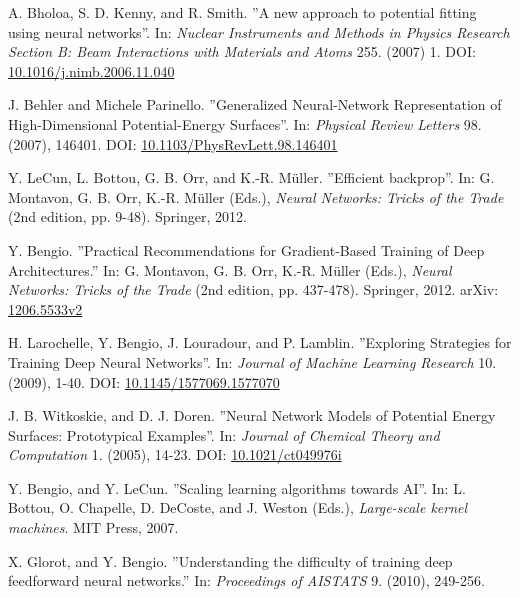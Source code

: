 \documentclass[twoside,english]{uiofysmaster}
\begin{document}
\begin{thebibliography}{56}
 A. Bholoa, S. D. Kenny, and R. Smith.
 ''A new approach to potential fitting using neural networks''.
 In: \textit{Nuclear Instruments and Methods in Physics Research Section B: 
 Beam Interactions with Materials and Atoms} 255. (2007) 1.
 DOI: \href{https://doi.org/10.1016/j.nimb.2006.11.040}{10.1016/j.nimb.2006.11.040}
 
 J. Behler and Michele Parinello. 
 ''Generalized Neural-Network Representation of High-Dimensional Potential-Energy Surfaces''.
 In: \textit{Physical Review Letters} 98. (2007), 146401. 
 DOI: \href{http://dx.doi.org/10.1103/PhysRevLett.98.146401}{10.1103/PhysRevLett.98.146401}
 
 Y. LeCun, L. Bottou, G. B. Orr, and K.-R. Müller.
 ''Efficient backprop''. 
 In: G. Montavon, G. B. Orr, K.-R. Müller (Eds.), \textit{Neural Networks: Tricks of the Trade} (2nd edition, pp. 9-48).
 Springer, 2012. 
 
 Y. Bengio. 
 ''Practical Recommendations for Gradient-Based Training of Deep Architectures.''
 In: G. Montavon, G. B. Orr, K.-R. Müller (Eds.), \textit{Neural Networks: Tricks of the Trade} (2nd edition, pp. 437-478). 
 Springer, 2012. 
 arXiv: \href{arxiv.org/abs/1206.5533v2}{1206.5533v2}
 
 H. Larochelle, Y. Bengio, J. Louradour, and P. Lamblin. 
 ''Exploring Strategies for Training Deep Neural Networks''. 
 In: \textit{Journal of Machine Learning Research} 10. (2009), 1-40. 
 DOI: \href{http://doi.org/10.1145/1577069.1577070}{10.1145/1577069.1577070}
 
 J. B. Witkoskie, and D. J. Doren. 
 ''Neural Network Models of Potential Energy Surfaces: Prototypical Examples''. 
 In: \textit{Journal of Chemical Theory and Computation} 1. (2005), 14-23. 
 DOI: \href{http://doi.org/10.1021/ct049976i}{10.1021/ct049976i}
 
 Y. Bengio, and Y. LeCun. 
 ''Scaling learning algorithms towards AI''. 
 In: L. Bottou, O. Chapelle, D. DeCoste, and J. Weston (Eds.), 
 \textit{Large-scale kernel machines}. MIT Press, 2007. 
 
 X. Glorot, and Y. Bengio. 
 ''Understanding the difficulty of training deep feedforward neural networks.''
 In: \textit{Proceedings of AISTATS} 9. (2010), 249-256. 
 
 
 
\end{thebibliography}
\end{document}
